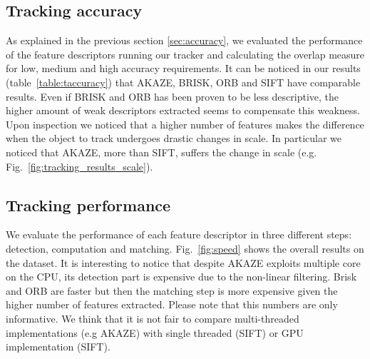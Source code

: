 \subsection{Tracking accuracy}

As explained in the previous section \ref{sec:accuracy}, we evaluated the performance of the feature descriptors running our tracker and calculating the overlap measure for low, medium and high accuracy requirements. It can be noticed in our results (table~\ref{table:taccuracy}) that AKAZE, BRISK, ORB and SIFT have comparable results. Even if BRISK and ORB has been proven to be less descriptive, the higher amount of weak descriptors extracted seems to compensate this weakness. Upon inspection we noticed that a higher number of features makes the difference when the object to track undergoes drastic changes in scale. In particular we noticed that AKAZE, more than SIFT, suffers the change in scale (e.g. Fig.~\ref{fig:tracking_results_scale}). 

\subsection{Tracking performance}

We evaluate the performance of each feature descriptor in three different steps: detection, computation and matching. Fig.~\ref{fig:speed} shows the overall results on the dataset. It is interesting to notice that despite AKAZE exploits multiple core on the CPU, its detection part is expensive due to the non-linear filtering. Brisk and ORB are faster but then the matching step is more expensive given the higher number of features extracted. Please note that this numbers are only informative. We think that it is not fair to compare multi-threaded implementations (e.g AKAZE) with single threaded (SIFT) or GPU implementation (SIFT).

